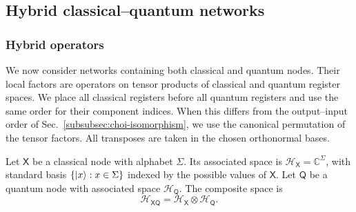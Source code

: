 \documentclass[
    aps,
    pra,
    reprint,
    superscriptaddress,
    nofootinbib
]{revtex4-2}
\theoremstyle{definition}
\theoremstyle{plain}
\begin{document}
\subsection{Hybrid classical--quantum networks}

\subsubsection{Hybrid operators}

We now consider networks containing both classical and quantum nodes. Their
local factors are operators on tensor products of classical and quantum
register spaces. We place all classical registers before all quantum
registers and use the same order for their component indices. When this
differs from the output--input order of Sec.~\ref{subsubsec:choi-isomorphism},
we use the canonical permutation of the tensor factors. All transposes are
taken in the chosen orthonormal bases.

Let $\mathsf{X}$ be a classical node with alphabet $\Sigma$. Its associated
space is
$\mathcal{H}_{\mathsf{X}}=\mathbb{C}^{\Sigma}$, with standard basis
$\{\ket{x}:x\in\Sigma\}$ indexed by the possible values of $\mathsf{X}$.
Let $\mathsf{Q}$ be a quantum node with associated space
$\mathcal{H}_{\mathsf{Q}}$. The composite space is
\begin{equation}
    \mathcal{H}_{\mathsf{X}\mathsf{Q}}
    =
    \mathcal{H}_{\mathsf{X}}
    \otimes
    \mathcal{H}_{\mathsf{Q}}.
\end{equation}
\end{document}
